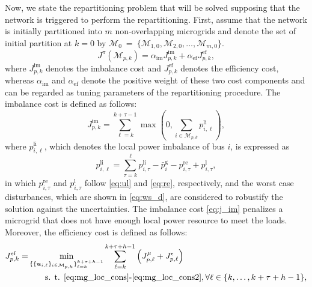 Now, we state the repartitioning problem that will be solved supposing that the network is triggered to perform the repartitioning. 
First, assume that the network is initially partitioned into $m$ non-overlapping microgrids and denote the set of initial partition at $k=0$ by $\boldsymbol{\mathcal{M}}_0~=~\{\mathcal{M}_{1,0}, \mathcal{M}_{2,0}, \dots, \mathcal{M}_{m,0} \}$. 
\iffalse 
\begin{equation}
J^{\pi}(\mathcal{M}_{p,k})= \alpha_{\mathrm{im}} J_{p,k}^{\mathrm{im}} + \alpha_{\mathrm{ef}} J_{p,k}^{\mathrm{ef}}, 
\label{eq:j_pi}
\end{equation}
where $J_{p,k}^{\mathrm{im}}$ denotes the imbalance cost and $J_{p,k}^{\mathrm{ef}}$ denotes the efficiency cost, whereas $\alpha_{\mathrm{im}}$ and $\alpha_{\mathrm{ef}}$ denote the positive weight of these two cost components and can be regarded as tuning parameters of the repartitioning procedure. The imbalance cost is defined as follows:
\begin{equation}
J_{p,k}^{\mathrm{im}} = \sum_{\ell =k}^{k+\tau-1}\max \left(0,\sum_{i \in \mathcal{M}_{p,k}}p_{i,\ell}^{\mathrm{li}}\right),
\label{eq:j_im}
\end{equation}
where $p_{i,\ell}^{\mathrm{li}}$, which denotes the local power imbalance of bus $i$, is expressed as
\begin{equation}
p_{i,\ell}^{\mathrm{li}}=  \sum_{\tau =k}^{\ell} p_{i,\tau}^{\mathrm{li}}-\bar{p}_{i}^{\mathrm{g}}  - {p}^{\mathrm{re}}_{i,\tau} + {p}^{\mathrm{l}}_{i,\tau},
\label{eq:p_li}
\end{equation}
in which
${p}^{\mathrm{re}}_{i,\tau}$ and ${p}^{\mathrm{l}}_{i,\tau}$ follow \eqref{eq:ul} and \eqref{eq:re}, respectively, and the worst case disturbances, which are shown in \eqref{eq:ws_d}, are considered to robustify the solution against the uncertainties.  The imbalance cost \eqref{eq:j_im} penalizes a microgrid that does not have enough local power resource to meet the loads. Moreover, the efficiency cost is defined  as follows:
\begin{equation}
\begin{aligned}
J_{p,k}^{\mathrm{ef}}=&\min_{\{\{\bm{u}_{i,\ell}\}_{i \in \mathcal{M}_{p,k}}\}_{\ell=k}^{k+\tau+h-1}} \sum_{\ell =k}^{k+\tau+h-1} \left(J_{p,\ell}^{\mu} + J_{p,\ell}^{{\epsilon}}\right)\\
& \quad \quad \text{s. t. \eqref{eq:mg_loc_cons}-\eqref{eq:mg_loc_cons2}}, \forall\ell \in\{k,\dots, k+\tau+h-1 \},
\end{aligned}
\label{eq:j_ef}
\end{equation}
